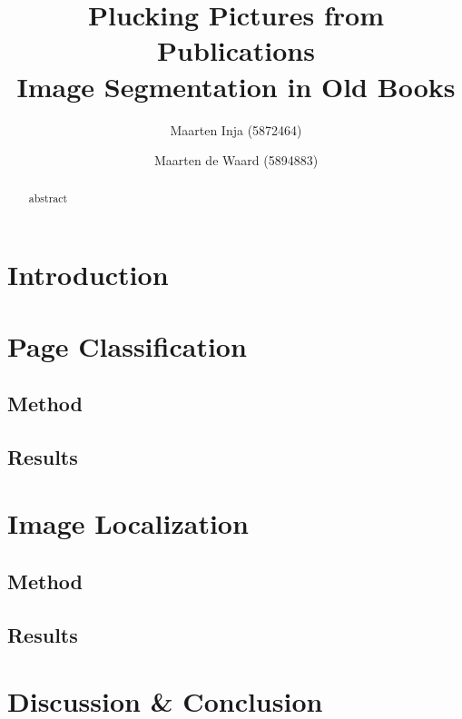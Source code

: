 \documentclass{article}
\title{Plucking Pictures from Publications\\ \large
Image Segmentation in Old Books}
\author{Maarten Inja (5872464) \and Maarten de Waard (5894883)}
\begin{document}
\maketitle

\begin{abstract}
abstract
\end{abstract}

\section{Introduction}
\label{sec:introduction}


\section{Page Classification}
\label{sec:pageclas}

\subsection{Method}
\label{subsec:pageclasmethod}

\subsection{Results}
\label{subsec:pageclasresults}


\section{Image Localization}
\label{sec:imageloc}

\subsection{Method}
\label{subsec:imagelocmethod}

\subsection{Results}
\label{subsec:imagelocresults}


\section{Discussion \& Conclusion}
\label{sec:discussionconclusion}




\end{document}
